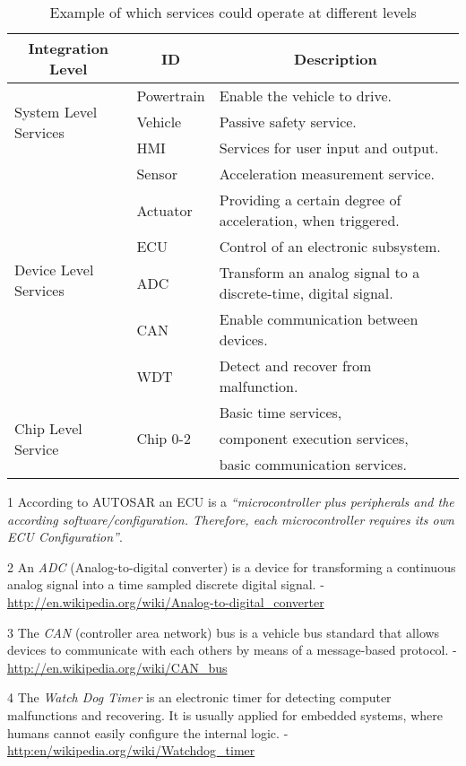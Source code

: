\begin{table}
\begin{threeparttable}[b]
\caption{Example of which services could operate at different levels}
\label{tab:services}
	\begin{tabular}{ p{4cm} p{3cm} p{8cm} }
	\hline
	\multicolumn{1}{|c|}{\textbf{Integration Level}} & 
		\multicolumn{1}{|c|}{\textbf{ID}} & 
		\multicolumn{1}{|c|}{\textbf{Description}} \\ 
	\hline
	\multirow{3}{*}{System Level Services} & Powertrain & Enable the vehicle  to drive. \\
		\cline{2-3}
		& Vehicle & Passive safety service. \\
		\cline{2-3}
		& HMI & Services for user input and output. \\ \hline
	\multirow{6}{*}{Device Level Services} & Sensor & Acceleration measurement service. \\
		\cline{2-3}
		& Actuator & Providing a certain degree of acceleration, when triggered. \\
		\cline{2-3}
		& ECU\tnote{1} & Control of an electronic subsystem. \\
		\cline{2-3}
		& ADC\tnote{2} & Transform an analog signal to a discrete-time, digital signal. \\
		\cline{2-3}
		& CAN\tnote{3} & Enable communication between devices. \\
		\cline{2-3}
		& WDT\tnote{4} & Detect and recover from malfunction. \\ \hline
	\multirow{3}{*}{Chip Level Service} && Basic time services, \\
		& Chip 0-2 & component execution services, \\
		&& basic communication services. \\ \hline
	\end{tabular}
	\begin{tablenotes}
		\item [1] According to AUTOSAR an ECU is a \emph{``microcontroller plus peripherals and the according software/configuration. Therefore, each microcontroller requires its own ECU Configuration''}.
		\item [2] An \emph{ADC} (Analog-to-digital converter) is a device for transforming a continuous analog signal into a time sampled discrete digital signal. - \url{http://en.wikipedia.org/wiki/Analog-to-digital_converter}
		\item [3] The \emph{CAN} (controller area network) bus is a vehicle bus standard that allows devices to communicate with each others by means of a message-based protocol. - \url{http://en.wikipedia.org/wiki/CAN\_bus}
		\item [4] The \emph{Watch Dog Timer} is an electronic timer for detecting computer malfunctions and recovering. It is usually applied for embedded systems, where humans cannot easily configure the internal logic. - \url{http:en/wikipedia.org/wiki/Watchdog\_timer}
	\end{tablenotes}
\end{threeparttable}
\end{table}
